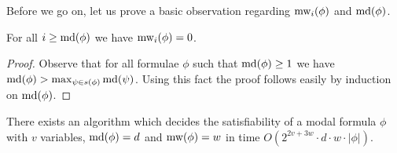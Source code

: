 \documentclass{llncs}
\newcommand{\md}{\ensuremath \textrm{md}}
\begin{document}
Before we go on, let us prove a basic observation regarding $\textrm{mw}_i(\phi)$ and
$\md(\phi)$.

\begin{lemma} 
For all $i\ge \md(\phi)$ we have $\textrm{mw}_i(\phi)=0$.
\end{lemma}

\begin{proof}

Observe that for all formulae $\phi$ such that $\md(\phi)\ge 1$ we have
$\md(\phi) > \max_{\psi\in s(\phi)} \md(\psi)$. Using this fact the proof
follows easily by induction on $\md(\phi)$.

\end{proof}



\begin{theorem}

There exists an algorithm which decides the satisfiability of a
modal formula $\phi$ with $v$ variables, $\md(\phi)=d$ and
$\textrm{mw}(\phi)=w$ in time $O(2^{2v+3w}\cdot d\cdot w\cdot |\phi|)$.

\end{theorem}
\end{document}
